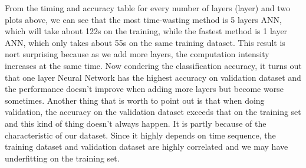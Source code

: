 \documentclass{article}
\begin{document}
From the timing and accuracy table for every number of layers (layer) and two plots above, we can see that the most time-wasting method is 5 layers ANN, which will take about 122s on the training, while the fastest method is 1 layer ANN, which only takes about 55s on the same training dataset. This result is nort surprising because as we add more layers, the computation intensity increases at the same time. \newline
Now condering the classification accuracy, it turns out that one layer Neural Network has the highest accuracy on validation dataset and the performance doesn't improve when adding more layers but become worse sometimes.\newline
Another thing that is worth to point out is that when doing validation, the accuracy on the validation dataset exceeds that on the training set and this kind of thing doesn't always happen. It is partly because of the characteristic of our dataset. Since it highly depends on time sequence, the training dataset and validation dataset are highly correlated and we may have underfitting on the training set.






\newpage







\end{document}
